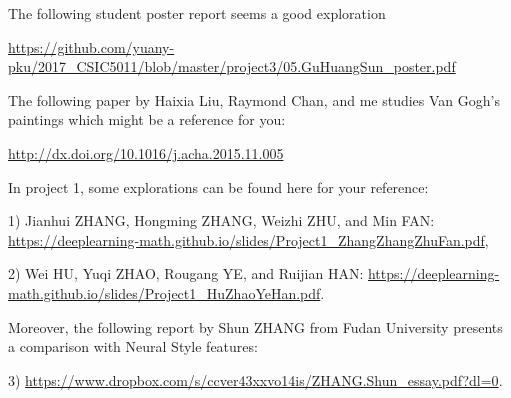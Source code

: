 \documentclass[11pt]{article}
\begin{document}
The following student poster report seems a good exploration

\url{https://github.com/yuany-pku/2017_CSIC5011/blob/master/project3/05.GuHuangSun_poster.pdf}

The following paper by Haixia Liu, Raymond Chan, and me studies Van Gogh's paintings which might be a reference for you:

\url{http://dx.doi.org/10.1016/j.acha.2015.11.005}

In project 1, some explorations can be found here for your reference: 

1) Jianhui ZHANG, Hongming ZHANG, Weizhi ZHU, and Min FAN: \url{https://deeplearning-math.github.io/slides/Project1_ZhangZhangZhuFan.pdf},

2) Wei HU, Yuqi ZHAO, Rougang YE, and Ruijian HAN: \url{https://deeplearning-math.github.io/slides/Project1_HuZhaoYeHan.pdf}.

Moreover, the following report by Shun ZHANG from Fudan University presents a comparison with Neural Style features:

3) \url{https://www.dropbox.com/s/ccver43xxvo14is/ZHANG.Shun_essay.pdf?dl=0}.

%
%
%
%
%
\end{document}
